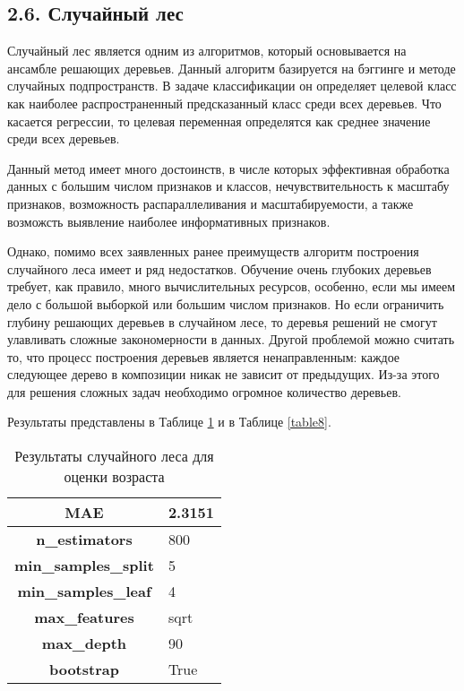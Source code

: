 \subsection{2.6. Случайный лес}
Случайный лес \cite{random forest} является одним из алгоритмов, который основывается на ансамбле решающих деревьев. Данный алгоритм базируется на бэггинге и методе случайных подпространств. В задаче классификации он определяет целевой класс как наиболее распространенный предсказанный класс среди всех деревьев. Что касается регрессии, то целевая переменная определятся как среднее значение среди всех деревьев.  

Данный метод имеет много достоинств, в числе которых эффективная обработка данных с большим числом признаков и классов, нечувствительность к масштабу признаков, возможность распараллеливания и масштабируемости, а также возможсть выявление наиболее информативных признаков.

Однако, помимо всех заявленных ранее преимуществ алгоритм построения случайного леса имеет и ряд недостатков. Обучение очень глубоких деревьев требует, как правило, много вычислительных ресурсов,
особенно, если мы имеем дело с большой выборкой или большим числом признаков. Но если ограничить глубину решающих деревьев в случайном лесе, то деревья решений не смогут улавливать сложные
закономерности в данных. Другой проблемой можно считать то, что процесс построения деревьев является ненаправленным: каждое следующее дерево в композиции никак не зависит от предыдущих. Из-за этого для решения сложных задач необходимо огромное количество деревьев. 

Результаты представлены в Таблице \ref{table7} и в Таблице \ref{table8}.

\setlength\extrarowheight{8pt}
\begin{table}[h!]
\centering
\begin{tabular}{|c|l|}
\hline
\textbf{MAE}                 & 2.3151  \\ \hline
\textbf{n\_estimators}       & 800     \\ \hline
\textbf{min\_samples\_split} & 5        \\ \hline
\textbf{min\_samples\_leaf}  & 4        \\ \hline
\textbf{max\_features}       & sqrt     \\ \hline
\textbf{max\_depth}          & 90      \\ \hline
\textbf{bootstrap}           & True     \\ \hline
\end{tabular}
\caption{Результаты случайного леса для оценки возраста}
\label{table7}
\end{table}


